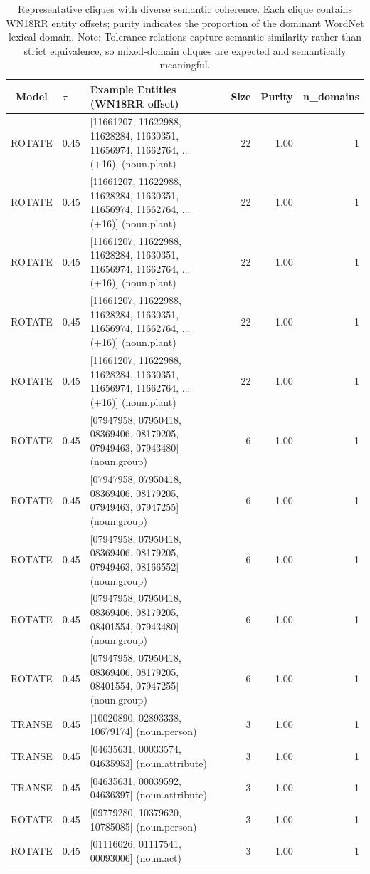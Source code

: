 
\begin{table}[ht]
\centering
\caption{Representative cliques with diverse semantic coherence. Each clique contains WN18RR entity offsets; purity indicates the proportion of the dominant WordNet lexical domain. Note: Tolerance relations capture semantic similarity rather than strict equivalence, so mixed-domain cliques are expected and semantically meaningful.}
\label{tab:case_studies}
\begin{tabular}{clp{9cm}rrr}
\toprule
Model & $\tau$ & Example Entities (WN18RR offset) & Size & Purity & n\_domains \\
\midrule
ROTATE & 0.45 & [11661207, 11622988, 11628284, 11630351, 11656974, 11662764, ... (+16)] (noun.plant) & 22 & 1.00 & 1 \\
ROTATE & 0.45 & [11661207, 11622988, 11628284, 11630351, 11656974, 11662764, ... (+16)] (noun.plant) & 22 & 1.00 & 1 \\
ROTATE & 0.45 & [11661207, 11622988, 11628284, 11630351, 11656974, 11662764, ... (+16)] (noun.plant) & 22 & 1.00 & 1 \\
ROTATE & 0.45 & [11661207, 11622988, 11628284, 11630351, 11656974, 11662764, ... (+16)] (noun.plant) & 22 & 1.00 & 1 \\
ROTATE & 0.45 & [11661207, 11622988, 11628284, 11630351, 11656974, 11662764, ... (+16)] (noun.plant) & 22 & 1.00 & 1 \\
ROTATE & 0.45 & [07947958, 07950418, 08369406, 08179205, 07949463, 07943480] (noun.group) & 6 & 1.00 & 1 \\
ROTATE & 0.45 & [07947958, 07950418, 08369406, 08179205, 07949463, 07947255] (noun.group) & 6 & 1.00 & 1 \\
ROTATE & 0.45 & [07947958, 07950418, 08369406, 08179205, 07949463, 08166552] (noun.group) & 6 & 1.00 & 1 \\
ROTATE & 0.45 & [07947958, 07950418, 08369406, 08179205, 08401554, 07943480] (noun.group) & 6 & 1.00 & 1 \\
ROTATE & 0.45 & [07947958, 07950418, 08369406, 08179205, 08401554, 07947255] (noun.group) & 6 & 1.00 & 1 \\
TRANSE & 0.45 & [10020890, 02893338, 10679174] (noun.person) & 3 & 1.00 & 1 \\
TRANSE & 0.45 & [04635631, 00033574, 04635953] (noun.attribute) & 3 & 1.00 & 1 \\
TRANSE & 0.45 & [04635631, 00039592, 04636397] (noun.attribute) & 3 & 1.00 & 1 \\
ROTATE & 0.45 & [09779280, 10379620, 10785085] (noun.person) & 3 & 1.00 & 1 \\
ROTATE & 0.45 & [01116026, 01117541, 00093006] (noun.act) & 3 & 1.00 & 1 \\
\bottomrule
\end{tabular}
\end{table}